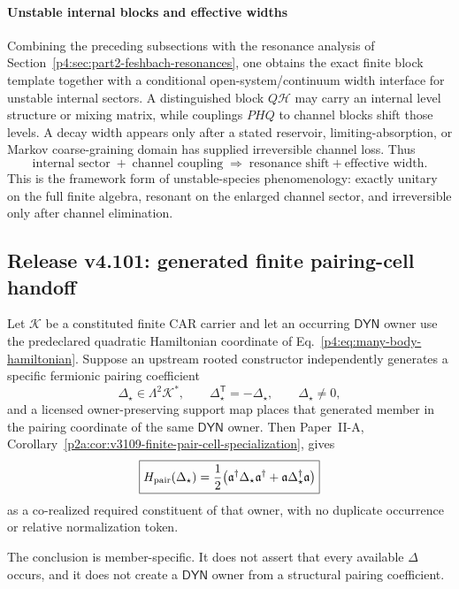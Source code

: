 \documentclass[12pt,a4paper]{article}
\begin{document}
\paragraph{Unstable internal blocks and effective widths}
\label{p4:sec:part2-unstable-blocks}

Combining the preceding subsections with the resonance analysis of Section~\ref{p4:sec:part2-feshbach-resonances},
one obtains the exact finite block template together with a conditional
open-system/continuum width interface for unstable internal sectors.
A distinguished block \(Q\mathcal H\) may carry an internal level structure or mixing matrix,
while couplings \(PHQ\) to channel blocks shift those levels.  A decay width
appears only after a stated reservoir, limiting-absorption, or Markov
coarse-graining domain has supplied irreversible channel loss.
Thus
\begin{equation}
\label{p4:eq:unstable-block-template}
\text{internal sector}
\;+\;
\text{channel coupling}
\;\Longrightarrow\;
\text{resonance shift} + \text{effective width}.
\end{equation}
This is the framework form of unstable-species phenomenology:
exactly unitary on the full finite algebra, resonant on the enlarged channel sector,
and irreversible only after channel elimination.



\subsection{Release v4.101: generated finite pairing-cell handoff}
\label{p4:sec:v4101-generated-pair-cell-handoff}

\begin{corollary}
\label{p4:cor:v4101-generated-pair-member-handoff}
Let $\mathcal K$ be a constituted finite CAR carrier and let an occurring
$\mathsf{DYN}$ owner use the predeclared quadratic Hamiltonian coordinate of
Eq.~\eqref{p4:eq:many-body-hamiltonian}.  Suppose an upstream rooted
constructor independently generates a specific fermionic pairing coefficient
\[
 \Delta_\star\in\Lambda^2\mathcal K^*,
 \qquad \Delta_\star^{\mathsf T}=-\Delta_\star,
 \qquad \Delta_\star\ne0,
\]
and a licensed owner-preserving support map places that generated member in
the pairing coordinate of the same $\mathsf{DYN}$ owner.  Then Paper~II-A,
Corollary~\ref{p2a:cor:v3109-finite-pair-cell-specialization}, gives
\[
 \boxed{
 H_{\rm pair}(\Delta_\star)
 =\frac12\bigl(
  \mathfrak a^\dagger\Delta_\star\mathfrak a^\dagger
  +\mathfrak a\Delta_\star^\dagger\mathfrak a
 \bigr)}
\]
as a co-realized required constituent of that owner, with no duplicate
occurrence or relative normalization token.

The conclusion is member-specific.  It does not assert that every available
$\Delta$ occurs, and it does not create a $\mathsf{DYN}$ owner from a
structural pairing coefficient.
\end{corollary}
\end{document}
